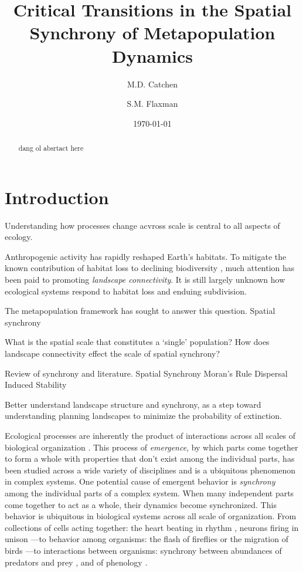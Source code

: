 \documentclass[]{article}
\title{Critical Transitions in the Spatial Synchrony of Metapopulation Dynamics}
\author[1,2]{M.D. Catchen}
\author[1]{S.M. Flaxman}
\affil[1]{\small{Department of Ecology and Evolutionary Biology, University of Colorado at Boulder}}
\affil[2]{\small{Department of Biology, McGill University}}
\date{\today}
\begin{document}
\maketitle
\begin{abstract}

dang ol absrtact here

\end{abstract}
\clearpage
\tableofcontents
\clearpage
\section{Introduction}

Understanding how processes change acvross scale is central to all aspects of ecology. 

Anthropogenic activity has rapidly reshaped Earth's habitats.
To mitigate the known contribution of habitat loss to declining biodiversity \cite{}, much attention has been paid to promoting \textit{landscape connectivity}.
It is still largely unknown how ecological systems respond to habitat loss and enduing subdivision.

The metapopulation framework has sought to answer this question.
Spatial synchrony


What is the spatial scale that constitutes a `single' population?
How does landscape connectivity effect the scale of spatial synchrony?

Review of synchrony and literature.
  Spatial Synchrony
  Moran's Rule
  Dispersal Induced Stability

Better understand landscape structure and synchrony, as a step toward understanding
planning landscapes to minimize the probability of extinction.





Ecological processes are inherently the product of interactions across all scales of biological organization \cite{levin_problem_1992}. This process of \textit{emergence}, by which parts come together to form a whole with properties that don't exist among the individual parts, has been studied across a wide variety of disciplines \cite{manrubia_emergence_2004} and is a ubiquitous phenomenon in complex systems. One potential cause of emergent behavior is \textit{synchrony} among the individual parts of a complex system. When many independent parts come together to act as a whole, their dynamics become synchronized.
This behavior is ubiquitous in biological systems across all scale of organization.
From collections of cells acting together: the heart beating in rhythm \cite{womelsdorf_modulation_2007}, neurons firing in unison \cite{strogatz_sync_2003}---to behavior among organisms: the flash of fireflies \cite{otte_theories_1980} or the migration of birds \cite{spottiswoode_extrapair_2004}---to interactions between organisms: synchrony between abundances of predators and prey \cite{lv}, and of phenology \cite{van_asch_phenology_2007,burkle_future_2011}.
\end{document}
